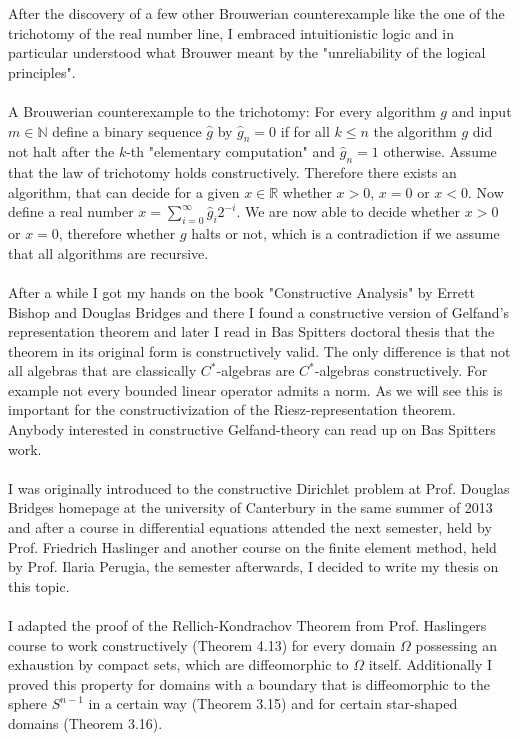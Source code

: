\documentclass[11pt,a4paper,leqno]{report}
\numberwithin{equation}{chapter}
\begin{document}
After the discovery of a few other Brouwerian counterexample like the one of the trichotomy of the real number line, I embraced intuitionistic logic and in particular understood what Brouwer meant by the "unreliability of the logical principles".\\
\\
A Brouwerian counterexample to the trichotomy: For every algorithm $g$ and input $m\in\mathbb{N}$ define a binary sequence $\hat{g}$ by $\hat{g}_n=0$ if for all $k\leq n$ the algorithm $g$ did not halt after the $k$-th "elementary computation" and $\hat{g}_n=1$ otherwise. Assume that the law of trichotomy holds constructively. Therefore there exists an algorithm, that can decide for a given $x\in\mathbb{R}$ whether $x>0$, $x=0$ or $x<0$. Now define a real number $x=\sum_{i=0}^\infty \hat{g}_i 2^{-i}$. We are now able to decide whether $x>0$ or $x=0$, therefore whether $g$ halts or not, which is a contradiction if we assume that all algorithms are recursive.
\\
\\
After a while I got my hands on the book "Constructive Analysis" by Errett Bishop and Douglas Bridges and there I found a constructive version of Gelfand's representation theorem and later I read in Bas Spitters doctoral thesis that the theorem in its original form is constructively valid. The only difference is that not all algebras that are classically $C^*$-algebras are $C^*$-algebras constructively. For example not every bounded linear operator admits a norm. As we will see this is important for the constructivization of the Riesz-representation theorem. Anybody interested in constructive Gelfand-theory can read up on Bas Spitters work.\\
\\
I was originally introduced to the constructive Dirichlet problem at Prof. Douglas Bridges homepage at the university of Canterbury in the same summer of 2013 and after a course in differential equations attended the next semester, held by Prof. Friedrich Haslinger and another course on the finite element method, held by Prof. Ilaria Perugia, the semester afterwards, I decided to write my thesis on this topic. 
\\
\\
I adapted the proof of the Rellich-Kondrachov Theorem from Prof. Haslingers course to work constructively (Theorem 4.13) for every domain $\Omega$ possessing an exhaustion by compact sets, which are diffeomorphic to $\Omega$ itself. Additionally I proved this property for domains with a boundary that is diffeomorphic to the sphere $S^{n-1}$ in a certain way (Theorem 3.15) and for certain star-shaped domains (Theorem 3.16). %
\newpage
\end{document}
